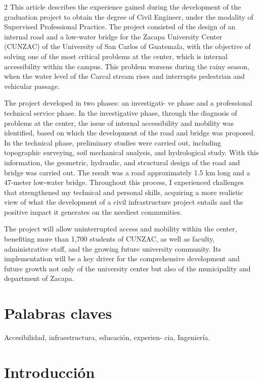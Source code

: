 \documentclass[12pt,spanish,Letterpaper,openany]{book}
\begin{document}
\begin {multicols}{2}
This article describes the experience gained during the development of the graduation project to obtain the degree of Civil Engineer, under the modality of Supervised Professional Practice. The project consisted of the design of an internal road and a low-water bridge for the Zacapa University Center (CUNZAC) of the University of San Carlos of Guatemala, with the objective of solving one of the most critical problems at the center, which is internal accessibility within the campus. This problem worsens during the rainy season, when the water level of the Carcal stream rises and interrupts pedestrian and vehicular passage.

The project developed in two phases: an investigati-
ve phase and a professional technical service phase. In the investigative phase, through the diagnosis of problems at the center, the issue of internal accessibility and mobility was identified, based on which the development of the road and bridge was proposed. In the technical phase, preliminary studies were carried out, including topographic surveying, soil mechanical analysis, and hydrological study. With this information, the geometric, hydraulic, and structural design of the road and bridge was carried out. The result was a road approximately 1.5 km long and a 47-meter low-water bridge. Throughout this process, I experienced challenges that strengthened my technical and personal skills, acquiring a more realistic view of what the development of a civil infrastructure project entails and the positive impact it generates on the neediest communities.

The project will allow uninterrupted access and mobility within the center, benefiting more than 1,700 students of CUNZAC, as well as faculty, administrative staff, and the growing future university community. Its implementation will be a key driver for the comprehensive development and future growth not only of the university center but also of the municipality and department of Zacapa.

\hypertarget{palabras-claves-2}{%
\section{Palabras claves}\label{palabras-claves-2}}

Accesibilidad, infraestructura, educación, experien-
cia, Ingeniería.

\hypertarget{introducciuxf3n-2}{%
\section{Introducción}\label{introducciuxf3n-2}}


\end{multicols}
\end{document}
